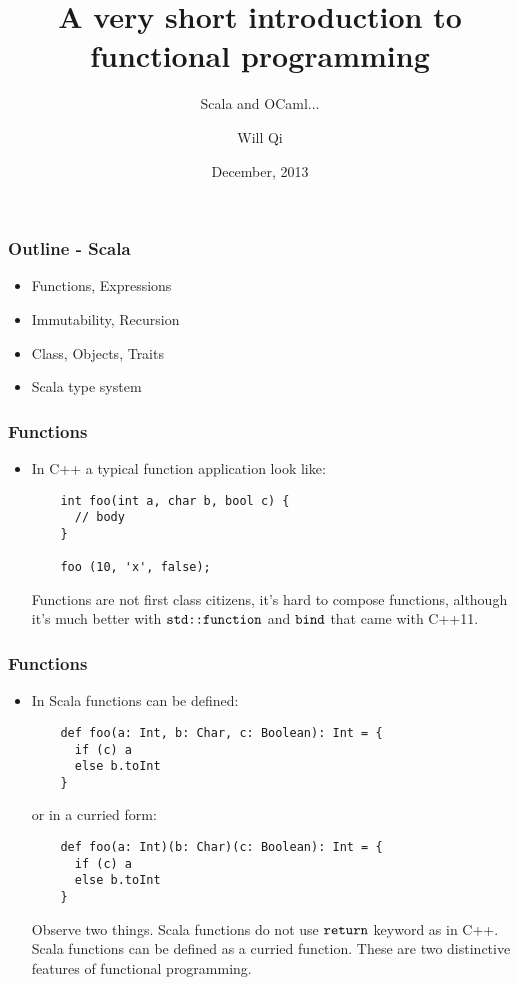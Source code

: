 \documentclass[handout]{beamer}
\title{A very short introduction to functional programming}
\subtitle{Scala and OCaml...}
\author{Will Qi}
\date{December, 2013}
\begin{document}
\maketitle

\begin{frame}
  \frametitle{Outline - Scala}
  \begin{itemize}
  \item Functions, Expressions
    \pause
  \item Immutability, Recursion
    \pause
  \item Class, Objects, Traits
    \pause
  \item Scala type system
  \end{itemize}
\end{frame}

\begin{frame}[fragile]
  \frametitle{Functions}
  \begin{itemize}
  \item In C++ a typical function application look like:
    \begin{verbatim}
    int foo(int a, char b, bool c) {
      // body
    }

    foo (10, 'x', false);
    \end{verbatim}

    \pause
    Functions are not first class citizens, it's hard to compose functions, although it's much better with $\verb|std::function|$
    and $\verb|bind|$ that came with C++11.
  \end{itemize}
\end{frame}

\begin{frame}[fragile]
  \frametitle{Functions}
  \begin{itemize}
  \item In Scala functions can be defined:
    \begin{verbatim}
    def foo(a: Int, b: Char, c: Boolean): Int = {
      if (c) a
      else b.toInt
    }
    \end{verbatim}
    or in a curried form:
    \begin{verbatim}
    def foo(a: Int)(b: Char)(c: Boolean): Int = {
      if (c) a
      else b.toInt
    }
    \end{verbatim}
    Observe two things. Scala functions do not use $\verb|return|$ keyword as in C++. Scala functions can be defined as a curried function. These are two distinctive features of functional programming.
  \end{itemize}
\end{frame}
\end{document}
